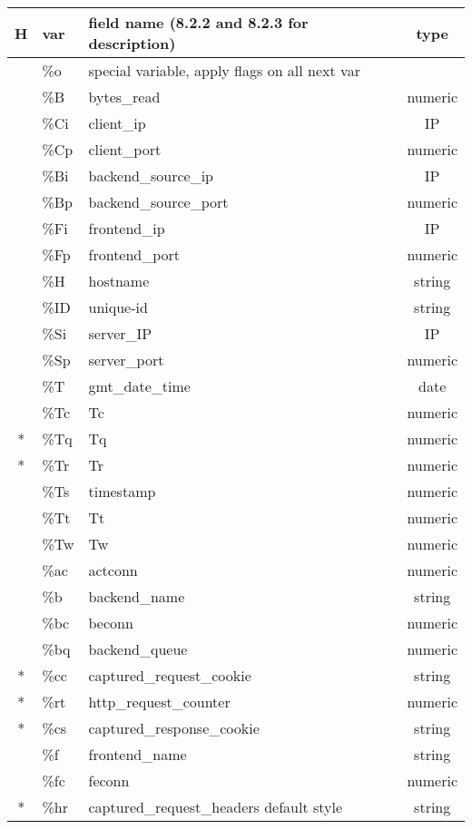 \begin{tabular}{|c|l|l|c|}
\hline
{H} & var & field name (8.2.2 and 8.2.3 for description) & type \\
\hline
{} & \%o & special variable, apply flags on all next var &  \\
\hline
{} & \%B & bytes\_read & numeric \\
\hline
{} & \%Ci & client\_ip & IP \\
\hline
{} & \%Cp & client\_port & numeric \\
\hline
{} & \%Bi & backend\_source\_ip & IP \\
\hline
{} & \%Bp & backend\_source\_port & numeric \\
\hline
{} & \%Fi & frontend\_ip & IP \\
\hline
{} & \%Fp & frontend\_port & numeric \\
\hline
{} & \%H & hostname & string \\
\hline
{} & \%ID & unique-id & string \\
\hline
{} & \%Si & server\_IP & IP \\
\hline
{} & \%Sp & server\_port & numeric \\
\hline
{} & \%T & gmt\_date\_time & date \\
\hline
{} & \%Tc & Tc & numeric \\
\hline
{*} & \%Tq & Tq & numeric \\
\hline
{*} & \%Tr & Tr & numeric \\
\hline
{} & \%Ts & timestamp & numeric \\
\hline
{} & \%Tt & Tt & numeric \\
\hline
{} & \%Tw & Tw & numeric \\
\hline
{} & \%ac & actconn & numeric \\
\hline
{} & \%b & backend\_name & string \\
\hline
{} & \%bc & beconn & numeric \\
\hline
{} & \%bq & backend\_queue & numeric \\
\hline
{*} & \%cc & captured\_request\_cookie & string \\
\hline
{*} & \%rt & http\_request\_counter & numeric \\
\hline
{*} & \%cs & captured\_response\_cookie & string \\
\hline
{} & \%f & frontend\_name & string \\
\hline
{} & \%fc & feconn & numeric \\
\hline
{*} & \%hr & captured\_request\_headers default style & string \\

\end{tabular}
